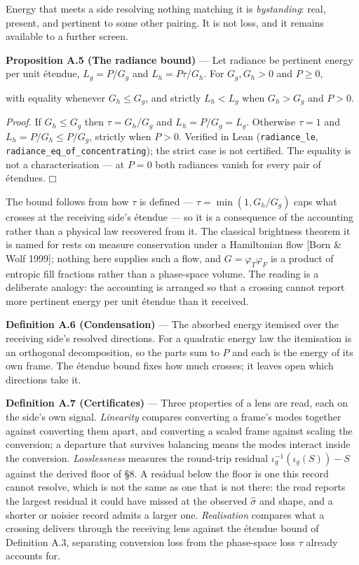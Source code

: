 \documentclass[10pt,letterpaper,twocolumn]{article}
\providecommand{\square}{\mdlgwhtsquare}\providecommand{\Box}{\mdlgwhtsquare}%
\begin{document}
Energy that meets a side resolving nothing matching it is \emph{bystanding}: real, present, and pertinent to some other pairing. It is not loss, and it remains available to a further screen.

\textbf{Proposition A.5 (The radiance bound)} --- Let radiance be pertinent energy per unit étendue, \(L_g=P/G_g\) and \(L_h=P\tau/G_h\). For \(G_g,G_h>0\) and \(P\ge 0\),


with equality whenever \(G_h\le G_g\), and strictly \(L_h<L_g\) when \(G_h>G_g\) and \(P>0\).

\emph{Proof.} If \(G_h\le G_g\) then \(\tau=G_h/G_g\) and \(L_h=P/G_g=L_g\). Otherwise \(\tau=1\) and \(L_h=P/G_h\le P/G_g\), strictly when \(P>0\). Verified in Lean (\texttt{radiance\_\allowbreak{}le}, \texttt{radiance\_\allowbreak{}eq\_\allowbreak{}of\_\allowbreak{}concentrating}); the strict case is not certified. The equality is not a characterisation --- at \(P=0\) both radiances vanish for every pair of étendues. \(\square\)

The bound follows from how \(\tau\) is defined --- \(\tau=\min(1,G_h/G_g)\) caps what crosses at the receiving side's étendue --- so it is a consequence of the accounting rather than a physical law recovered from it. The classical brightness theorem it is named for rests on measure conservation under a Hamiltonian flow {[}Born \& Wolf 1999{]}; nothing here supplies such a flow, and \(G=\varphi_T\varphi_F\) is a product of entropic fill fractions rather than a phase-space volume. The reading is a deliberate analogy: the accounting is arranged so that a crossing cannot report more pertinent energy per unit étendue than it received.

\textbf{Definition A.6 (Condensation)} --- The absorbed energy itemised over the receiving side's resolved directions. For a quadratic energy law the itemisation is an orthogonal decomposition, so the parts sum to \(P\) and each is the energy of its own frame. The étendue bound fixes how much crosses; it leaves open which directions take it.

\textbf{Definition A.7 (Certificates)} --- Three properties of a lens are read, each on the side's own signal. \emph{Linearity} compares converting a frame's modes together against converting them apart, and converting a scaled frame against scaling the conversion; a departure that survives balancing means the modes interact inside the conversion. \emph{Losslessness} measures the round-trip residual \(\iota_g^{-1}(\iota_g(S))-S\) against the derived floor of §8. A residual below the floor is one this record cannot resolve, which is not the same as one that is not there: the read reports the largest residual it could have missed at the observed \(\hat\sigma\) and shape, and a shorter or noisier record admits a larger one. \emph{Realisation} compares what a crossing delivers through the receiving lens against the étendue bound of Definition A.3, separating conversion loss from the phase-space loss \(\tau\) already accounts for.
\end{document}
